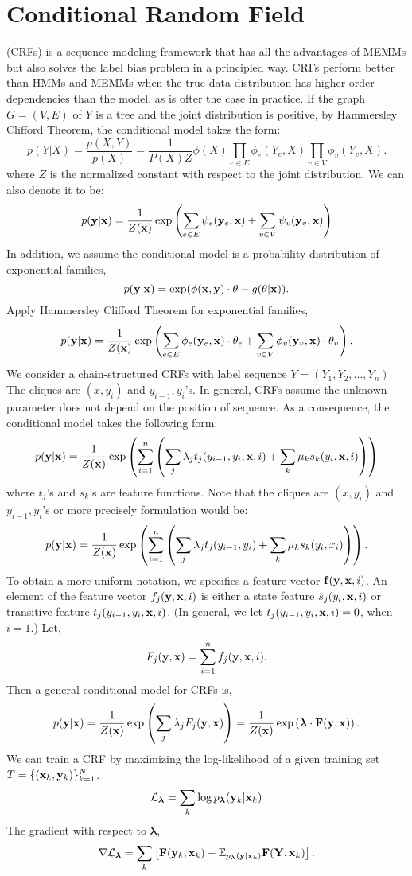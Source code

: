 \documentclass{amsart}
\theoremstyle{plain}
\theoremstyle{definition}
\theoremstyle{remark}
\numberwithin{equation}{section}
\begin{document}
\section{Conditional Random Field}\label{sec:intro}
 (CRFs)\cite{lafferty2001conditional} is a sequence modeling framework 
that has all the advantages of MEMMs but also solves the label bias problem in a principled way. 
CRFs perform better than HMMs and MEMMs when the true data distribution has higher-order dependencies than the model, 
as is ofter the case in practice.
If the graph $G = (V,E)$ of $Y$ is a tree and the joint distribution is positive, 
by Hammersley Clifford Theorem\cite{hammersley1971markov}, the conditional model takes the form: 
\[p(Y|X) = \frac{p(X,Y)}{p(X)} = \frac{1}{P(X)Z}\phi(X)\prod_{e\in E}\phi_e(Y_e,X)\prod_{v\in V}\phi_v(Y_v,X).\]
where $Z$ is the normalized constant with respect to the joint distribution.
We can also denote it to be:
\[p({\bf y}|{\bf x}) = \frac{1}{Z({\bf x})}\exp\left(\sum_{e\in E}\psi_{e}({\bf y}_e,
{\bf x})+\sum_{v\in V}\psi_{v}({\bf y}_v,{\bf x})\right)\]
In addition, we assume the conditional model is a probability distribution of exponential families,
\[p({\bf y}|{\bf x}) = \exp(\phi({\bf x},{\bf y})\cdot \theta-g(\theta|{\bf x})).\]
Apply Hammersley Clifford Theorem for exponential families,
\[p({\bf y}|{\bf x}) = \frac{1}{Z({\bf x})}\exp\left(\sum_{e\in E}\phi_e({\bf y}_e,
{\bf x})\cdot \theta_{e}+\sum_{v\in V}\phi_v({\bf y}_v,{\bf x})\cdot\theta_{v}\right).\]
We consider a chain-structured CRFs with label sequence $Y = (Y_1,Y_2,...,Y_n)$. 
The cliques are $(x,y_i)$ and $y_{i-1},y_i$'s. 
In general, CRFs assume the unknown parameter does not depend on the position of sequence. 
As a consequence, the conditional model takes the following form:
\[p({\bf y}|{\bf x})=\frac{1}{Z({\bf x})}\exp\left(\sum_{i=1}^n
\left(\sum_j\lambda_j t_j(y_{i-1},y_i,{\bf x},i)+\sum_k \mu_k s_k(y_i,{\bf x},i)\right)\right)\]
where $t_j$'s and $s_k$'s are feature functions.
Note that the cliques are $(x,y_i)$ and $y_{i-1},y_i$'s or more precisely formulation would be:
\[p({\bf y}|{\bf x})=\frac{1}{Z({\bf x})}\exp\left(\sum_{i=1}^n
\left(\sum_j\lambda_j t_j(y_{i-1},y_i)+\sum_k \mu_k s_k(y_i,x_i)\right)\right).\]
To obtain a more uniform notation, we specifies a feature vector ${\bf f}({\bf y},{\bf x},i)$. 
An element of the feature vector $f_j({\bf y},{\bf x},i)$ is either a state feature $s_j(y_i,{\bf x},i)$ 
or transitive feature $t_j(y_{i-1},y_i,{\bf x},i)$. 
(In general, we let $t_j(y_{i-1},y_i,{\bf x},i)=0$, when $i=1$.)
Let,\[F_j({\bf y},{\bf x})=\sum_{i=1}^n f_j({\bf y},{\bf x},i).\]
Then a general conditional model for CRFs is,
\[p({\bf y}|{\bf x})=\frac{1}{Z({\bf x})}\exp\left(\sum_j\lambda_jF_j({\bf y},
{\bf x})\right)=\frac{1}{Z({\bf x})}\exp\left(\boldsymbol{\lambda} \cdot{\bf F}({\bf y},{\bf x})\right).\]
We can train a CRF\cite{sha2003shallow} by maximizing the log-likelihood of a given training set 
$T=\{({\bf x}_k,{\bf y}_k)\}_{k=1}^N$.
\[\mathcal{L}_{\boldsymbol{\lambda}}=\sum_k \log p_{\boldsymbol{\lambda}}({\bf y}_k|{\bf x}_k)\]
The gradient with respect to $\boldsymbol{\lambda}$,
\[\nabla \mathcal{L}_{\boldsymbol{\lambda}}=\sum_k \left[{\bf F}({\bf y}_k,{\bf x}_k)
-\mathbb{E}_{p_{\boldsymbol{\lambda}}({\bf y}|{\bf x}_k)}{\bf F}({\bf Y},{\bf x}_k)\right].\]
\end{document}
